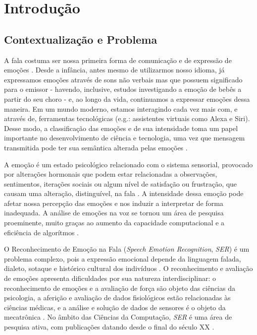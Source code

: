\chapter{Introdução}\label{Cap:Introdução}

\section{Contextualização e Problema}

A fala costuma ser nossa primeira forma de comunicação e de expressão de emoções \cite{1.5}. Desde a infância, antes mesmo de utilizarmos nosso idioma, já expressamos emoções através de sons não verbais mas que possuem significado para o emissor - havendo, inclusive, estudos investigando a emoção de bebês a partir do seu choro \cite{0} - e, ao longo da vida, continuamos a expressar emoções dessa maneira. Em um mundo moderno, estamos interagindo cada vez mais com, e através de, ferramentas tecnológicas (e.g.: assistentes virtuais como Alexa e Siri). Desse modo, a classificação das emoções e de sua intensidade toma um papel importante \cite{3} no desenvolvimento de ciência e tecnologia, uma vez que mensagem transmitida pode ter sua semântica alterada pelas emoções \cite{39}.

A emoção é um estado psicológico relacionado com o sistema sensorial, provocado por alterações hormonais que podem estar relacionadas a observações, sentimentos, iterações sociais ou algum nível de satisfação ou frustração, que causam uma alteração, distinguível, na fala \cite{8}. A intensidade dessa emoção pode afetar nossa percepção das emoções \cite{18.46} e nos induzir a interpretar de forma inadequada. A análise de emoções na voz se tornou um área de pesquisa proeminente, muito graças ao aumento da capacidade computacional e a eficiência de algorítmos \cite{38} \cite{20}.

O Reconhecimento de Emoção na Fala (\textit{Speech Emotion Recognition}, \textit{SER}) é um problema complexo, pois a expressão emocional depende da linguagem falada, dialeto, sotaque e histórico cultural dos indivíduos \cite{6}. O reconhecimento e avaliação de emoções apresenta dificuldades por sua natureza interdisciplinar: o reconhecimento de emoções e a avaliação de força são objeto das ciências da psicologia, a aferição e avaliação de dados fisiológicos estão relacionadas às ciências médicas, e a análise e solução de dados de sensores é o objeto da mecatrônica \cite{17}. No âmbito das Ciências da Computação, \textit{SER} é uma área de pesquisa ativa, com publicações datando desde o final do século XX \cite{12.27}.

